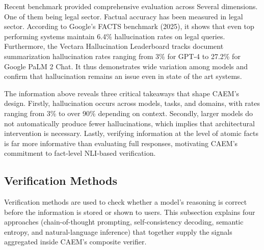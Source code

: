 Recent benchmark provided comprehensive evaluation across Several dimensions. One of them being legal sector. Factual accuracy has been measured in legal sector. According to Google's FACTS benchmark (2025), it shows that even top performing systems maintain 6.4\% hallucination rates on legal queries. Furthermore, the Vectara Hallucination Leaderboard tracks document summarization hallucination rates ranging from 3\% for GPT-4 to 27.2\% for Google PaLM 2 Chat. It thus demonstrates wide variation among models and confirm that hallucination remains an issue even in state of the art systems.

The information above reveals three critical takeaways that shape CAEM's design. Firstly, hallucination occurs across models, tasks, and domains, with rates ranging from 3\% to over 90\% depending on context. Secondly, larger models do not automatically produce fewer hallucinations, which implies that architectural intervention is necessary. Lastly, verifying information at the level of atomic facts is far more informative than evaluating full responses, motivating CAEM's commitment to fact-level NLI-based verification.

\subsection{Verification Methods}

Verification methods are used to check whether a model's reasoning is correct before the information is stored or shown to users. This subsection explains four approaches (chain-of-thought prompting, self-consistency decoding, semantic entropy, and natural-language inference) that together supply the signals aggregated inside CAEM's composite verifier.

